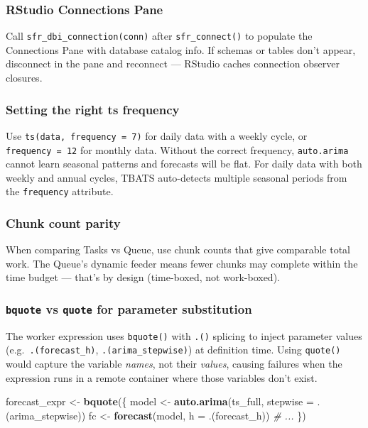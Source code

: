 \documentclass[
]{article}
\newenvironment{Shaded}{\begin{snugshade}}{\end{snugshade}}
\newcommand{\AttributeTok}[1]{\textcolor[rgb]{0.13,0.29,0.53}{#1}}
\newcommand{\CommentTok}[1]{\textcolor[rgb]{0.56,0.35,0.01}{\textit{#1}}}
\newcommand{\FunctionTok}[1]{\textcolor[rgb]{0.13,0.29,0.53}{\textbf{#1}}}
\newcommand{\NormalTok}[1]{#1}
\newcommand{\OtherTok}[1]{\textcolor[rgb]{0.56,0.35,0.01}{#1}}
\begin{document}
\subsubsection{RStudio Connections Pane}\label{rstudio-connections-pane}

Call \texttt{sfr\_dbi\_connection(conn)} after \texttt{sfr\_connect()}
to populate the Connections Pane with database catalog info. If schemas
or tables don't appear, disconnect in the pane and reconnect --- RStudio
caches connection observer closures.

\subsubsection{Setting the right ts
frequency}\label{setting-the-right-ts-frequency}

Use \texttt{ts(data,\ frequency\ =\ 7)} for daily data with a weekly
cycle, or \texttt{frequency\ =\ 12} for monthly data. Without the
correct frequency, \texttt{auto.arima} cannot learn seasonal patterns
and forecasts will be flat. For daily data with both weekly and annual
cycles, TBATS auto-detects multiple seasonal periods from the
\texttt{frequency} attribute.

\subsubsection{Chunk count parity}\label{chunk-count-parity}

When comparing Tasks vs Queue, use chunk counts that give comparable
total work. The Queue's dynamic feeder means fewer chunks may complete
within the time budget --- that's by design (time-boxed, not
work-boxed).

\subsubsection{\texorpdfstring{\texttt{bquote} vs \texttt{quote} for
parameter
substitution}{bquote vs quote for parameter substitution}}\label{bquote-vs-quote-for-parameter-substitution}

The worker expression uses \texttt{bquote()} with \texttt{.()} splicing
to inject parameter values (e.g.~\texttt{.(forecast\_h)},
\texttt{.(arima\_stepwise)}) at definition time. Using \texttt{quote()}
would capture the variable \emph{names}, not their \emph{values},
causing failures when the expression runs in a remote container where
those variables don't exist.

\begin{Shaded}
\begin{Highlighting}[]
\NormalTok{forecast\_expr }\OtherTok{\textless{}{-}} \FunctionTok{bquote}\NormalTok{(\{}
\NormalTok{  model }\OtherTok{\textless{}{-}} \FunctionTok{auto.arima}\NormalTok{(ts\_full, }\AttributeTok{stepwise =}\NormalTok{ .(arima\_stepwise))}
\NormalTok{  fc    }\OtherTok{\textless{}{-}} \FunctionTok{forecast}\NormalTok{(model, }\AttributeTok{h =}\NormalTok{ .(forecast\_h))}
  \CommentTok{\# ...}
\NormalTok{\})}
\end{Highlighting}
\end{Shaded}
\end{document}
